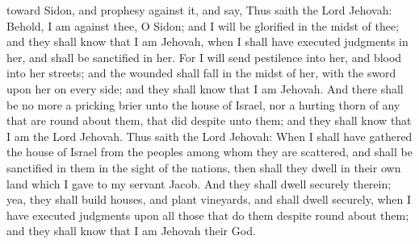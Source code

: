 toward Sidon, and prophesy against it, and say, Thus saith the Lord Jehovah: Behold, I am against thee, O Sidon; and I will be glorified in the midst of thee; and they shall know that I am Jehovah, when I shall have executed judgments in her, and shall be sanctified in her. For I will send pestilence into her, and blood into her streets; and the wounded shall fall in the midst of her, with the sword upon her on every side; and they shall know that I am Jehovah. And there shall be no more a pricking brier unto the house of Israel, nor a hurting thorn of any that are round about them, that did despite unto them; and they shall know that I am the Lord Jehovah.  Thus saith the Lord Jehovah: When I shall have gathered the house of Israel from the peoples among whom they are scattered, and shall be sanctified in them in the sight of the nations, then shall they dwell in their own land which I gave to my servant Jacob. And they shall dwell securely therein; yea, they shall build houses, and plant vineyards, and shall dwell securely, when I have executed judgments upon all those that do them despite round about them; and they shall know that I am Jehovah their God. 


